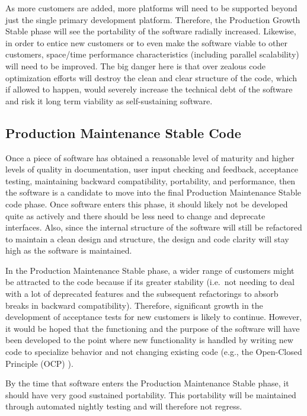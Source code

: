 \documentclass[11pt]{SANDreport}
\begin{document}
As more customers are added, more platforms will need to be supported
beyond just the single primary development platform.  Therefore, the
Production Growth Stable phase will see the portability of the
software radially increased.  Likewise, in order to entice new
customers or to even make the software viable to other customers,
space/time performance characteristics (including parallel
scalability) will need to be improved.  The big danger here is that
over zealous code optimization efforts will destroy the clean and
clear structure of the code, which if allowed to happen, would
severely increase the technical debt of the software and risk it long
term viability as self-sustaining software.


%
{}\subsection{Production Maintenance Stable Code}
%

Once a piece of software has obtained a reasonable level of maturity
and higher levels of quality in documentation, user input checking and
feedback, acceptance testing, maintaining backward compatibility,
portability, and performance, then the software is a candidate to move
into the final Production Maintenance Stable code phase.  Once software
enters this phase, it should likely not be developed quite as actively
and there should be less need to change and deprecate interfaces.
Also, since the internal structure of the software will still be
refactored to maintain a clean design and structure, the design and
code clarity will stay high as the software is maintained.

In the Production Maintenance Stable phase, a wider range of customers
might be attracted to the code because if its greater stability (i.e.\
not needing to deal with a lot of deprecated features and the
subsequent refactorings to absorb breaks in backward compatibility).
Therefore, significant growth in the development of acceptance tests
for new customers is likely to continue.  However, it would be hoped
that the functioning and the purpose of the software will have been
developed to the point where new functionality is handled by writing
new code to specialize behavior and not changing existing code (e.g.,
the Open-Closed Principle (OCP) {}\cite{AgileSoftwareDevelopment}).

By the time that software enters the Production Maintenance Stable
phase, it should have very good sustained portability.  This portability
will be maintained through automated nightly testing and will therefore
not regress.
\end{document}
